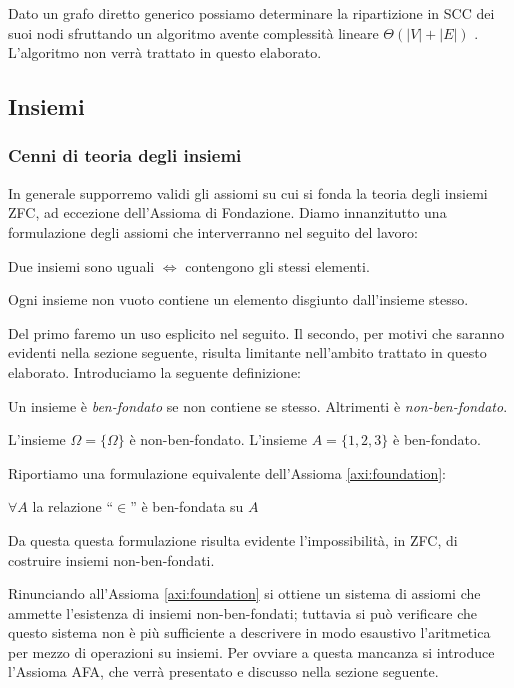 Dato un grafo diretto generico possiamo determinare la ripartizione in SCC dei suoi nodi sfruttando un algoritmo avente complessità lineare $\Theta(|V| + |E|)$ \cite{tarjan}. L'algoritmo non verrà trattato in questo elaborato.

\subsection{Insiemi}
\subsubsection{Cenni di teoria degli insiemi}
In generale supporremo validi gli assiomi su cui si fonda la teoria degli insiemi ZFC, ad eccezione dell'Assioma di Fondazione. Diamo innanzitutto una formulazione degli assiomi che interverranno nel seguito del lavoro:
\begin{axiom}[di estensionalità]
    Due insiemi sono uguali $\iff$ contengono gli stessi elementi.
\end{axiom}
\begin{axiom}[di fondazione]
    Ogni insieme non vuoto contiene un elemento disgiunto dall'insieme stesso.
    \label{axi:foundation}
\end{axiom}
Del primo faremo un uso esplicito nel seguito. Il secondo, per motivi che saranno evidenti nella sezione seguente, risulta limitante nell'ambito trattato in questo elaborato. Introduciamo la seguente definizione:
\begin{definition}
    Un insieme è \emph{ben-fondato} se non contiene se stesso. Altrimenti è \emph{non-ben-fondato}.
\end{definition}
\begin{example}
    L'insieme $\Omega = \{\Omega\}$ è non-ben-fondato. L'insieme $A = \{1,2,3\}$ è ben-fondato.
\end{example}
Riportiamo una formulazione equivalente dell'Assioma \ref{axi:foundation}:
\begin{axiom*}
    $\forall A$ la relazione ``$\in$'' è ben-fondata su $A$ \cite[Chapter III.4]{kunen}
\end{axiom*}
Da questa questa formulazione risulta evidente l'impossibilità, in ZFC, di costruire insiemi non-ben-fondati.

Rinunciando all'Assioma \ref{axi:foundation} si ottiene un sistema di assiomi che ammette l'esistenza di insiemi non-ben-fondati; tuttavia si può verificare che questo sistema non è più sufficiente a descrivere in modo esaustivo l'aritmetica per mezzo di operazioni su insiemi. Per ovviare a questa mancanza si introduce l'Assioma AFA, che verrà presentato e discusso nella sezione seguente.

